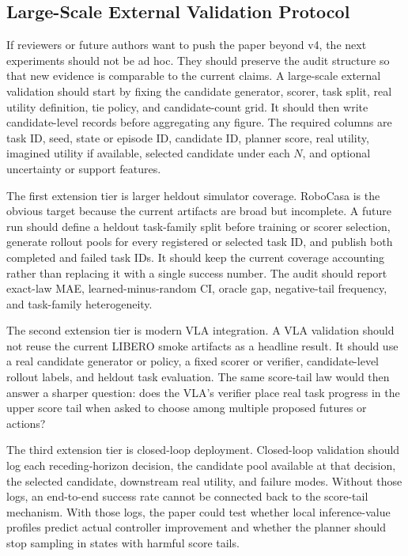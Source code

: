 \subsection{Large-Scale External Validation Protocol}
\label{app:external-validation}

If reviewers or future authors want to push the paper beyond v4, the next
experiments should not be ad hoc. They should preserve the audit structure so
that new evidence is comparable to the current claims. A large-scale external
validation should start by fixing the candidate generator, scorer, task split,
real utility definition, tie policy, and candidate-count grid. It should then
write candidate-level records before aggregating any figure. The required
columns are task ID, seed, state or episode ID, candidate ID, planner score,
real utility, imagined utility if available, selected candidate under each
$N$, and optional uncertainty or support features.

The first extension tier is larger heldout simulator coverage. RoboCasa is the
obvious target because the current artifacts are broad but incomplete. A
future run should define a heldout task-family split before training or scorer
selection, generate rollout pools for every registered or selected task ID,
and publish both completed and failed task IDs. It should keep the current
coverage accounting rather than replacing it with a single success number.
The audit should report exact-law MAE, learned-minus-random CI, oracle gap,
negative-tail frequency, and task-family heterogeneity.

The second extension tier is modern VLA integration. A VLA validation should
not reuse the current LIBERO smoke artifacts as a headline result. It should
use a real candidate generator or policy, a fixed scorer or verifier,
candidate-level rollout labels, and heldout task evaluation. The same
score-tail law would then answer a sharper question: does the VLA's verifier
place real task progress in the upper score tail when asked to choose among
multiple proposed futures or actions?

The third extension tier is closed-loop deployment. Closed-loop validation
should log each receding-horizon decision, the candidate pool available at that
decision, the selected candidate, downstream real utility, and failure modes.
Without those logs, an end-to-end success rate cannot be connected back to the
score-tail mechanism. With those logs, the paper could test whether local
inference-value profiles predict actual controller improvement and whether
the planner should stop sampling in states with harmful score tails.

